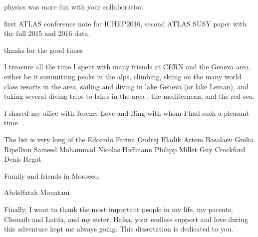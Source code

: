 physics was more fun with your collaboration

first ATLAS conference note for ICHEP2016, second ATLAS SUSY paper with the full 2015 and 2016 data.

thanks for the good times 

I treasure all the time I spent with many friends at CERN and the Geneva area,
either be it summitting peaks in the alps, climbing, skiing on the many world class resorts in the area, 
sailing and diving in lake Geneva (or lake Leman), and taking several diving trips to lakes in the area , 
the mediternean, and the red sea.

I shared my office with Jeremy Love and Bing with whom I had such a pleasant time. 

The list is very long of the 
Edoardo Farina
Ondrej Hladik
Artem Basalaev
Giulia Ripellion
Sameed Mohammad
Nicolas Hoffmann
Philipp Millet
Guy Crockford
Denis Regat


Family and friends in Morocco. 

Abdelfatah Mouatani

Finally, I want to thank the most important people in my life, my parents, Chouaib and Latifa, and my sister, Hafsa, 
your endless support and love during this adventure kept me always going. This dissertation is dedicated to you.

